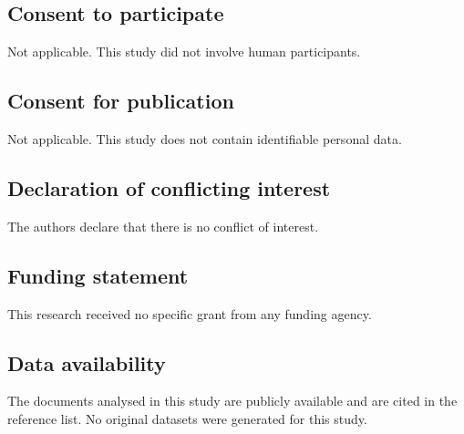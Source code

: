 \documentclass[12pt,a4paper]{article}
\begin{document}
\subsection*{Consent to participate}
Not applicable. This study did not involve human participants.

\subsection*{Consent for publication}
Not applicable. This study does not contain identifiable personal data.

\subsection*{Declaration of conflicting interest}
The authors declare that there is no conflict of interest.

\subsection*{Funding statement}
This research received no specific grant from any funding agency.

\subsection*{Data availability}
The documents analysed in this study are publicly available and are cited in the reference list. No original datasets were generated for this study.
\end{document}
